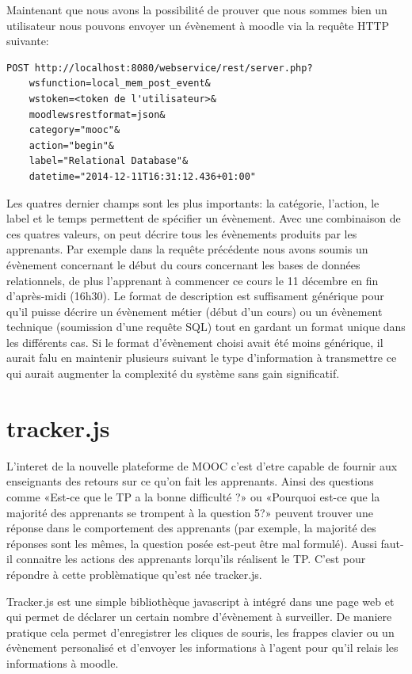 \documentclass[a4paper,11pt]{report}
\begin{document}
Maintenant que nous avons la possibilité de prouver que nous sommes bien un utilisateur nous pouvons envoyer un évènement à moodle via la requête HTTP suivante:

\begin{lstlisting}[caption={Soumet un évènement}]
POST http://localhost:8080/webservice/rest/server.php?
    wsfunction=local_mem_post_event&
    wstoken=<token de l'utilisateur>&
    moodlewsrestformat=json&
    category="mooc"&
    action="begin"&
    label="Relational Database"&
    datetime="2014-12-11T16:31:12.436+01:00"
\end{lstlisting}

Les quatres dernier champs sont les plus importants: la catégorie, l'action, le label et le temps permettent de spécifier un évènement. Avec une combinaison de ces quatres valeurs, on peut décrire tous les évènements produits par les apprenants. Par exemple dans la requête précédente nous avons soumis un évènement concernant le début du cours concernant les bases de données relationnels, de plus l'apprenant à commencer ce cours le 11 décembre en fin d'après-midi (16h30).
Le format de description est suffisament générique pour qu'il puisse décrire un évènement métier (début d'un cours) ou un évènement technique (soumission d'une requête SQL) tout en gardant un format unique dans les différents cas. Si le format d'évènement choisi avait été moins générique, il aurait falu en maintenir plusieurs suivant le type d'information à transmettre ce qui aurait augmenter la complexité du système sans gain significatif.

\section{tracker.js}

L'interet de la nouvelle plateforme de MOOC c'est d'etre capable de fournir aux enseignants des retours sur ce qu'on fait les apprenants. Ainsi des questions comme «Est-ce que le TP a la bonne difficulté ?» ou «Pourquoi est-ce que la majorité des apprenants se trompent à la question 5?» peuvent trouver une réponse dans le comportement des apprenants (par exemple, la majorité des réponses sont les mêmes, la question posée est-peut être mal formulé). Aussi faut-il connaitre les actions des apprenants lorqu'ils réalisent le TP.
C'est pour répondre à cette problèmatique qu'est née tracker.js.

Tracker.js est une simple bibliothèque javascript à intégré dans une page web et qui permet de déclarer un certain nombre d'évènement à surveiller.
De maniere pratique cela permet d'enregistrer les cliques de souris, les frappes clavier ou un évènement personalisé et d'envoyer les informations à l'agent pour qu'il relais les informations à moodle.
\end{document}
